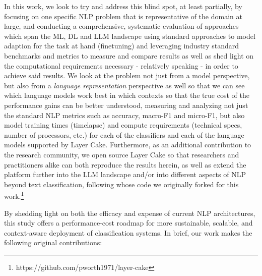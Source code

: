 \documentclass[final]{clv2025}
\begin{document}
In this work, we look to try and address this blind spot, at least partially, by focusing on one specific NLP problem that is representative of the domain at large, and conducting a comprehensive, systematic evaluation of approaches which span the ML, DL and LLM landscape using standard approaches to model adaption for the task at hand (finetuning) and leveraging industry standard benchmarks and metrics to measure and compare results as well as shed light on the computational requirements necessary - relatively speaking - in order to achieve said results. We look at the problem not just from a model perspective, but also from a \textit{language representation} perspective as well so that we can see which language models work best in which contexts so that the true cost of the performance gains can be better understood, measuring and analyzing not just the standard NLP metrics such as accuracy, macro-F1 and micro-F1, but also model training times (timelapse) and compute requirements (technical specs, number of processors, etc.) for each of the classifiers and each of the language models supported by Layer Cake. Furthermore, as an additional contribution to the research community, we open source Layer Cake so that researchers and practitioners alike can both reproduce the results herein, as well as extend the platform further into the LLM landscape and/or into different aspects of NLP beyond text classification, following \cite{moreo} whose code we originally forked for this work.\footnote{https://github.com/pworth1971/layer-cake}

By shedding light on both the efficacy and expense of current NLP architectures, this study offers a performance-cost roadmap for more sustainable, scalable, and context-aware deployment of classification systems. In brief, our work makes the following original contributions:
\end{document}
